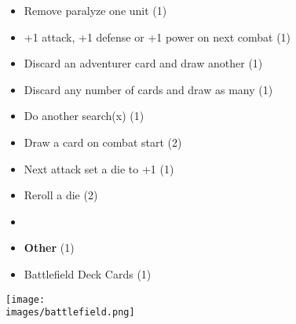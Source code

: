 \begin{multicols}{3}
\begin{itemize}[leftmargin=0pt, label={}, noitemsep]
  \item Remove paralyze one unit (1)
  \item +1 attack, +1 defense or +1 power on next combat (1)
  \item Discard an adventurer card and draw another (1)
  \item Discard any number of cards and draw as many (1)
  \item Do another search(x) (1)
  \item Draw a card on combat start (2)
  \item Next attack set a die to +1 (1)
  \item Reroll a die (2)
  \item
  \item \textbf{Other} (1)
  \item Battlefield Deck Cards (1)
\end{itemize}

\end{multicols}

\vfill
\begin{center}
  \texttt{[image: \\images/battlefield.png]}
\end{center}
